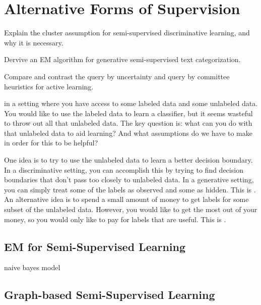 
\chapter{Alternative Forms of Supervision} \label{sec:semi}

\chapterquote{}{}

\begin{learningobjectives}
\item Explain the cluster assumption for semi-supervised
  discriminative learning, and why it is necessary.
\item Dervive an EM algorithm for generative semi-supervised text
  categorization.
\item Compare and contrast the query by uncertainty and query by
  committee heuristics for active learning.
\end{learningobjectives}

\dependencies{}

 in a setting where you have access
to some labeled data and some unlabeled data.  You would like to use
the labeled data to learn a classifier, but it seems wasteful to throw
out all that unlabeled data.  The key question is: what can you do
with that unlabeled data to aid learning?  And what assumptions do we
have to make in order for this to be helpful?

One idea is to try to use the unlabeled data to learn a better
decision boundary.  In a discriminative setting, you can accomplish
this by trying to find decision boundaries that don't pass too closely
to unlabeled data.  In a generative setting, you can simply treat some
of the labels as observed and some as hidden.  This is
.  An alternative idea is
to spend a small amount of money to get labels for some subset of the
unlabeled data.  However, you would like to get the most out of your
money, so you would only like to pay for labels that are useful.  This
is .

\section{EM for Semi-Supervised Learning}

naive bayes model

\section{Graph-based Semi-Supervised Learning}


